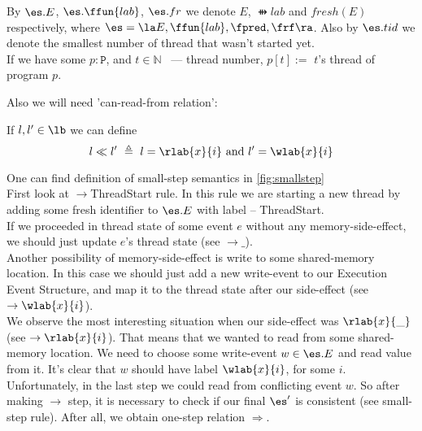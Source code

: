 By $\es.E$, $\es.\ffun{lab}$, $\es.fr$ we denote $E$, $\ffun{lab}$ and $fresh(E)$ respectively, where $\es = \la E, \ffun{lab}, \fpred, \frf \ra$. Also by $\es.tid$ we denote the smallest number of thread that wasn't started yet. \\
If we have some $p : \texttt{P}$, and $t \in \mathbb{N}$ ~--- thread number, $p[t] :=$ $t$'s thread of program $p$. 

Also we will need 'can-read-from relation':
\begin{definition}
  If $l, l' \in \lb$ we can define
  $$ l \ll l' \ \triangleq \ l = \rlab{x}{i} \ \text{and} \ l' = \wlab{x}{i}$$
\end{definition}

One can find definition of small-step semantics in \cref{fig:smallstep} \\
First look at $\to$ThreadStart rule. In this rule we are starting a new thread by adding some fresh identifier to $\es.E$ with label -- ThreadStart. \\
If we proceeded in thread state of some event $e$ without any memory-side-effect, we should just update $e$'s thread state (see $\to\_$). \\
Another possibility of memory-side-effect is write to some shared-memory location. In this case we should just add a new write-event to our Execution Event Structure, and map it to the thread state after our side-effect (see $\to\wlab{x}{i}$). \\
We observe the most interesting situation when our side-effect was $\rlab{x}{\_}$ (see $\to\rlab{x}{i}$). That means that we wanted to read from some shared-memory location. We need to choose some write-event $w \in \es.E$ and read value from it. It's clear that $w$ should have label $\wlab{x}{i}$, for some $i$. \\
Unfortunately, in the last step we could read from conflicting event $w$. So after making $\to$ step, it is necessary to check if our final $\es'$ is consistent (see small-step rule). After all, we obtain one-step relation $\Rightarrow$.
